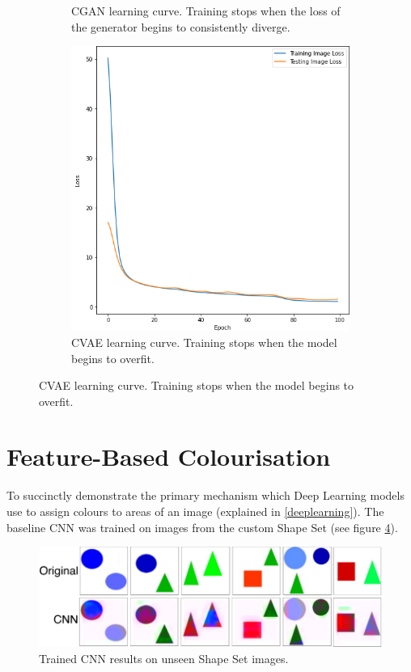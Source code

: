 \documentclass{l4proj}
\begin{document}
\begin{figure}[H]
\begin{subfigure}[b]{0.3\textwidth}
        \caption{CGAN learning curve. Training stops when the loss of the generator begins to consistently diverge.}
        \label{fig:cgantime}
    \end{subfigure}
    \begin{subfigure}[b]{0.3\textwidth}
        \includegraphics[width=\textwidth]{images/CVAETime.png}
        \caption{CVAE learning curve. Training stops when the model begins to overfit.}
        \label{fig:cvaetime}
    \end{subfigure}
    \label{fig:timeeval}
\end{figure}

\section{Feature-Based Colourisation}
\label{shapeseteval}

To succinctly demonstrate the primary mechanism which Deep Learning models use to assign colours to areas of an image (explained in \ref{deeplearning}). The baseline CNN was trained on images from the custom Shape Set (see figure \ref{fig:shapeseteval}). 

\begin{figure}[h]
    \centering
    \includegraphics[width=1.0\linewidth]{images/ShapeSetEval.png}    
    \caption{Trained CNN results on unseen Shape Set images.}

    \label{fig:shapeseteval} 
\end{figure}
\end{document}

